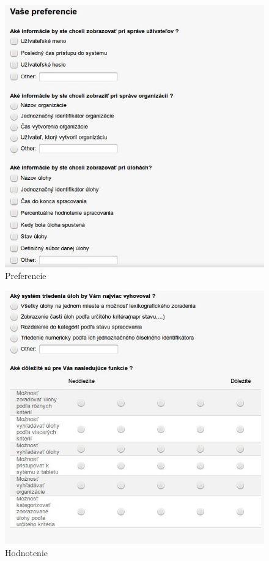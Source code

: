{{\begin{figure}[htb]
\begin{center}
\includegraphics[scale=0.5]{dotaz1.jpg} 
\caption{Preferencie}


\end{center}

\end{figure}


\begin{figure}[htb]

\begin{center}

\includegraphics[scale=0.5]{dotaz2.jpg} 
\caption{Hodnotenie}



\end{center}
\end{figure}}}
